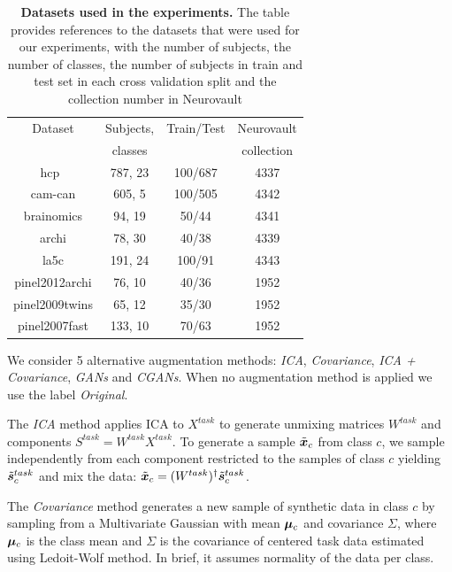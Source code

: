 \begin{table}
\begin{center}
\begin{tabular}{c|c|c|c}
\hline
Dataset & Subjects, & Train/Test & Neurovault \\
 & classes  &  & collection 
\\ \hline
hcp~\cite{van2013wu}  & 787, 23 & 100/687  &  4337
\\
cam-can \cite{shafto2014cambridge}  & 605, 5 & 100/505  &  4342
\\
brainomics \cite{orfanos2017brainomics}  & 94, 19 & 50/44  &   4341
\\
archi \cite{pinel2019functional}  & 78, 30 & 40/38  &  4339
\\
la5c \cite{poldrack2016phenome}  & 191, 24 & 100/91  &  4343
\\
pinel2012archi \cite{pinel2019functional} & 76, 10 & 40/36  &  1952
\\
pinel2009twins \cite{pinel2013genetic}  & 65, 12 & 35/30  &  1952
\\
pinel2007fast \cite{pinel2007fast} & 133, 10 & 70/63  &  1952
\\\hline\hline
\end{tabular}
\end{center}
\caption{\textbf{Datasets used in the experiments.} The table provides
  references to the datasets that were used for our experiments, with
  the number of subjects, the number of classes, the number of subjects in train
  and test set in each cross validation split and the collection number in Neurovault}
  \label{fig:dataset:tab}
\end{table}


We consider 5 alternative
augmentation methods: \emph{ICA}, \emph{Covariance}, \emph{ICA + Covariance}, \emph{GANs} and \emph{CGANs}.
%
When no augmentation method is applied we use the label \emph{Original}.

The \emph{ICA} method applies ICA to $X^{task}$ to generate unmixing matrices $W^{task}$ and
components $S^{task}=  W^{task} X^{task}$.
%
To generate a sample $\tilde{\boldsymbol{x}}_c$ from class $c$, we sample
independently from each component restricted to the samples of class $c$ yielding $\tilde{\boldsymbol{s}}^{task}_c$ and mix the data: $\tilde{\boldsymbol{x}}_c = (W^{task})^{\dagger}
\tilde{\boldsymbol{s}}^{task}_c$.
%

The \emph{Covariance} method generates a new sample of
synthetic data in class $c$ by sampling from a Multivariate Gaussian
with mean $\boldsymbol{\mu}_c$ and covariance $\Sigma$, where $\boldsymbol{\mu}_c$ is the
class mean and $\Sigma$ is the covariance of centered task data
estimated using Ledoit-Wolf method.
%
In brief, it assumes normality of the data per class.

